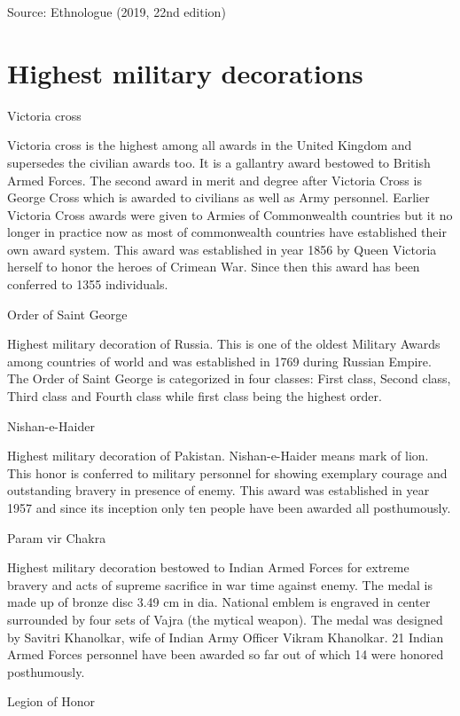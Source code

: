 \documentclass[
  openany]{book}
\begin{document}
Source: Ethnologue (2019, 22nd edition)

\hypertarget{highest-military-decorations}{%
\section{Highest military decorations}\label{highest-military-decorations}}

Victoria cross

Victoria cross is the highest among all awards in the United Kingdom and supersedes the civilian awards too. It is a gallantry award bestowed to British Armed Forces. The second award in merit and degree after Victoria Cross is George Cross which is awarded to civilians as well as Army personnel. Earlier Victoria Cross awards were given to Armies of Commonwealth countries but it no longer in practice now as most of commonwealth countries have established their own award system. This award was established in year 1856 by Queen Victoria herself to honor the heroes of Crimean War. Since then this award has been conferred to 1355 individuals.

Order of Saint George

Highest military decoration of Russia. This is one of the oldest Military Awards among countries of world and was established in 1769 during Russian Empire. The Order of Saint George is categorized in four classes: First class, Second class, Third class and Fourth class while first class being the highest order.

Nishan-e-Haider

Highest military decoration of Pakistan. Nishan-e-Haider means mark of lion. This honor is conferred to military personnel for showing exemplary courage and outstanding bravery in presence of enemy. This award was established in year 1957 and since its inception only ten people have been awarded all posthumously.

Param vir Chakra

Highest military decoration bestowed to Indian Armed Forces for extreme bravery and acts of supreme sacrifice in war time against enemy. The medal is made up of bronze disc 3.49 cm in dia. National emblem is engraved in center surrounded by four sets of Vajra (the mytical weapon). The medal was designed by Savitri Khanolkar, wife of Indian Army Officer Vikram Khanolkar. 21 Indian Armed Forces personnel have been awarded so far out of which 14 were honored posthumously.

Legion of Honor
\end{document}

